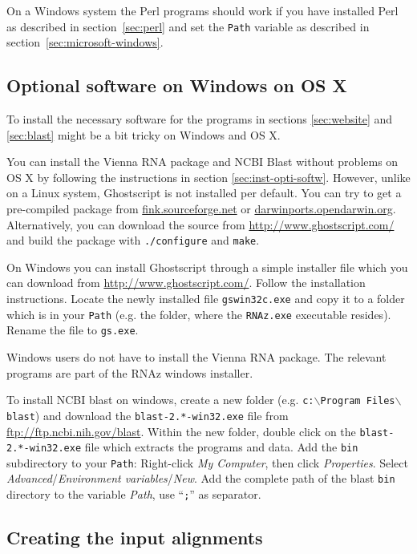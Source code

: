 \documentclass[11pt]{article}
\begin{document}
On a Windows system the Perl programs should work if you have installed
Perl as described in section~\ref{sec:perl} and set the \texttt{Path}
variable as described in section~\ref{sec:microsoft-windows}.

\subsection{Optional software on Windows on OS X}
\label{sec:opti-softw-wind}

To install the necessary software for the programs in sections
\ref{sec:website} and \ref{sec:blast} might be a bit tricky on Windows and
OS X.

You can install the Vienna RNA package and NCBI Blast without problems on
OS X by following the instructions in section \ref{sec:inst-opti-softw}.
However, unlike on a Linux system, Ghostscript is not installed per
default. You can try to get a pre-compiled package from
\url{fink.sourceforge.net} or \url{darwinports.opendarwin.org}.
Alternatively, you can download the source from
\url{http://www.ghostscript.com/} and build the package with
\texttt{./configure} and \texttt{make}.

On Windows you can install Ghostscript through a simple installer file
which you can download from \url{http://www.ghostscript.com/}. Follow the
installation instructions. Locate the newly installed file
\texttt{gswin32c.exe} and copy it to a folder which is in your
\texttt{Path} (e.g.  the folder, where the \texttt{RNAz.exe} executable
resides).  Rename the file to \texttt{gs.exe}.

Windows users do not have to install the Vienna RNA package. The relevant
programs are part of the RNAz windows installer.

To install NCBI blast on windows, create a new folder (e.g.
\texttt{c:$\backslash$Program Files$\backslash$blast}) and download the
\texttt{blast-2.*-win32.exe} file from \url{ftp://ftp.ncbi.nih.gov/blast}.
Within the new folder, double click on the \texttt{blast-2.*-win32.exe}
file which extracts the programs and data. Add the \texttt{bin}
subdirectory to your \texttt{Path}: Right-click \emph{My Computer}, then
click \emph{Properties}.  Select \emph{Advanced}/\emph{Environment
  variables}/\emph{New}. Add the complete path of the blast \texttt{bin}
directory to the variable \emph{Path}, use ``\texttt{;}'' as separator.


\subsection{Creating the input alignments}
\label{sec:creat-input-alignm}
\end{document}
